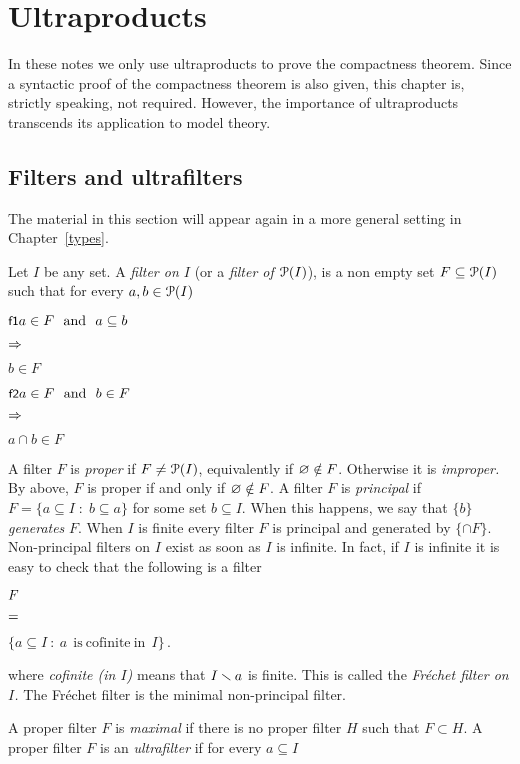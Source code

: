 \chapter{Ultraproducts}
\label{ultraprodotti}

\def\medrel#1{\parbox[t]{6ex}{$\displaystyle\hfil #1$}}
\def\ceq#1#2#3{\parbox[b]{25ex}{$\displaystyle #1$}\medrel{#2}$\displaystyle  #3$}

In these notes we only use ultraproducts to prove the compactness theorem. Since a syntactic proof of the compactness theorem is also given, this chapter is, strictly speaking, not required. However, the importance of ultraproducts transcends its application to model theory.


\section{Filters and ultrafilters}\label{ultrafiltri}

The material in this section will appear again in a more general setting in Chapter~\ref{types}.

Let $I$ be any set. A \emph{filter on $I$\/} (or a \emph{filter of $\P(I)$}), is a non empty set $F\subseteq \P(I)$ such that for every $a, b\in \P(I)$

\ceq{\ssf{f1}\hfill a\in F\ \ \textrm{and}\ \ a\subseteq b}{\IMP}{b\in F}

\ceq{\ssf{f2}\hfill a\in F\ \ \textrm{and}\ \ b\in F}{\IMP}{a\cap b\in F}

A filter $F$ is \emph{proper\/} if $F\neq\P(I)$, equivalently if $\0\notin F$. Otherwise it is \emph{improper.} By  above, $F$ is proper if and only if $\0\notin F$. A filter $F$ is \emph{principal\/} if $F=\{a\subseteq I\; :\; b\subseteq a\}$ for some set $b\subseteq I$. When this happens, we say that $\{b\}$ \emph{generates\/} $F$. When $I$ is finite every filter $F$ is principal and generated by $\{\cap F\}$. Non-principal filters on $I$ exist as soon as $I$ is infinite. In fact, if $I$ is infinite it is easy to check that the following is a filter

\ceq{\hfill F}{=}{\Big\{a\subseteq I\ :\ a \ \mathrm{\ is\ cofinite\ in\ }\ I\Big\}\, .}

where \emph{cofinite (in $I$)} means that $I\sm a$ is finite. This is called the \emph{Fr\'echet filter on $I$.} The Fr\'echet filter is the minimal non-principal filter.

A proper filter $F$ is \emph{maximal\/} if there is no proper filter $H$ such that $F\subset H$. A proper filter $F$ is an \emph{ultrafilter\/} if for every $a\subseteq I$

